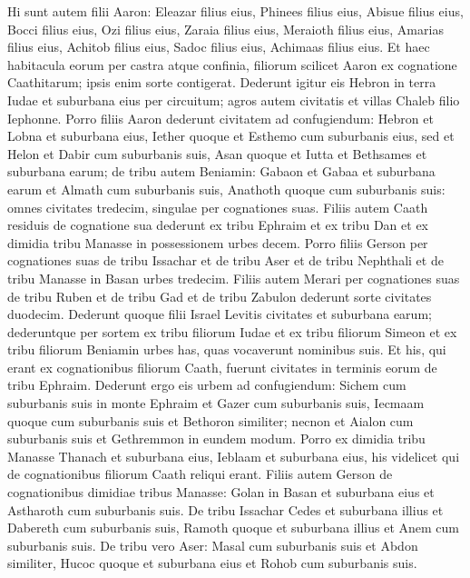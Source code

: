 \begin{biblechapter}
\verse Hi sunt autem filii Aaron: Eleazar filius eius, Phinees filius eius, Abisue filius eius, 
\verse Bocci filius eius, Ozi filius eius, Zaraia filius eius,  
\verse Meraioth filius eius, Amarias filius eius, Achitob filius eius, 
\verse Sadoc filius eius, Achimaas filius eius. 
\verse Et haec habitacula eorum per castra atque confinia, filiorum scilicet Aaron ex cognatione Caathitarum; ipsis enim sorte contigerat. 
\verse Dederunt igitur eis Hebron in terra Iudae et suburbana eius per circuitum; 
\verse agros autem civitatis et villas Chaleb filio Iephonne. 
\verse Porro filiis Aaron dederunt civitatem ad confugiendum: Hebron et Lobna et suburbana eius, 
\verse Iether quoque et Esthemo cum suburbanis eius, sed et Helon et Dabir cum suburbanis suis, 
\verse Asan quoque et Iutta et Bethsames et suburbana earum; 
\verse de tribu autem Beniamin: Gabaon et Gabaa et suburbana earum et Almath cum suburbanis suis, Anathoth quoque cum suburbanis suis: omnes civitates tredecim, singulae per cognationes suas. 
\verse Filiis autem Caath residuis de cognatione sua dederunt ex tribu Ephraim et ex tribu Dan et ex dimidia tribu Manasse in possessionem urbes decem. 
\verse Porro filiis Gerson per cognationes suas de tribu Issachar et de tribu Aser et de tribu Nephthali et de tribu Manasse in Basan urbes tredecim. 
\verse Filiis autem Merari per cognationes suas de tribu Ruben et de tribu Gad et de tribu Zabulon dederunt sorte civitates duodecim. 
\verse Dederunt quoque filii Israel Levitis civitates et suburbana earum; 
\verse dederuntque per sortem ex tribu filiorum Iudae et ex tribu filiorum Simeon et ex tribu filiorum Beniamin urbes has, quas vocaverunt nominibus suis. 
\verse Et his, qui erant ex cognationibus filiorum Caath, fuerunt civitates in terminis eorum de tribu Ephraim. 
\verse Dederunt ergo eis urbem ad confugiendum: Sichem cum suburbanis suis in monte Ephraim et Gazer cum suburbanis suis, 
\verse Iecmaam quoque cum suburbanis suis et Bethoron similiter; 
\verse necnon et Aialon cum suburbanis suis et Gethremmon in eundem modum. 
\verse Porro ex dimidia tribu Manasse Thanach et suburbana eius, Ieblaam et suburbana eius, his videlicet qui de cognationibus filiorum Caath reliqui erant. 
\verse Filiis autem Gerson de cognationibus dimidiae tribus Manasse: Golan in Basan et suburbana eius et Astharoth cum suburbanis suis. 
\verse De tribu Issachar Cedes et suburbana illius et Dabereth cum suburbanis suis, 
\verse Ramoth quoque et suburbana illius et Anem cum suburbanis suis. 
\verse De tribu vero Aser: Masal cum suburbanis suis et Abdon similiter, 
\verse Hucoc quoque et suburbana eius et Rohob cum suburbanis suis. 

\end{biblechapter}
